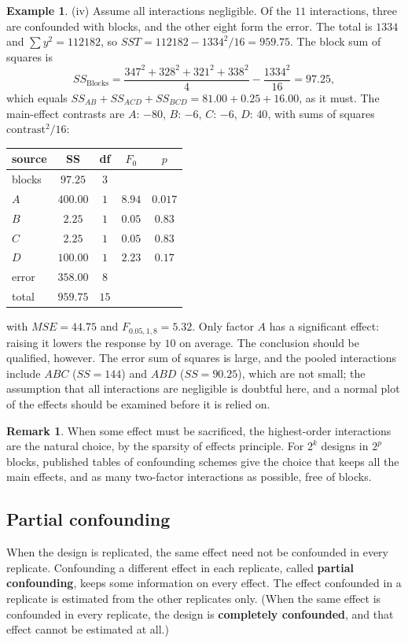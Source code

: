 \documentclass[11pt,a4paper]{article}
\numberwithin{equation}{section}
\theoremstyle{definition}
\newtheorem{exa}[thm]{Example}
\newtheorem*{remark}{Remark}
\begin{document}
\begin{exa}
(iv) Assume all interactions negligible. Of the $11$ interactions, three are confounded with blocks, and the other eight form the error.
The total is $1334$ and $\sum y^2 = 112182$, so $SST = 112182 - 1334^2/16 = 959.75$. The block sum of squares is
\[
SS_{\mathrm{Blocks}} = \frac{347^2 + 328^2 + 321^2 + 338^2}{4} - \frac{1334^2}{16} = 97.25 ,
\]
which equals $SS_{AB} + SS_{ACD} + SS_{BCD} = 81.00 + 0.25 + 16.00$, as it must. The main-effect contrasts are $A$: $-80$, $B$: $-6$, $C$: $-6$, $D$: $40$, with sums of squares
$\text{contrast}^2/16$:
\begin{center}
\begin{tabular}{l|c|c|c|c}
source & SS & df & $F_0$ & $p$ \\
\hline
blocks & $97.25$ & $3$ & & \\
$A$ & $400.00$ & $1$ & $8.94$ & $0.017$ \\
$B$ & $2.25$ & $1$ & $0.05$ & $0.83$ \\
$C$ & $2.25$ & $1$ & $0.05$ & $0.83$ \\
$D$ & $100.00$ & $1$ & $2.23$ & $0.17$ \\
error & $358.00$ & $8$ & & \\
\hline
total & $959.75$ & $15$ & &
\end{tabular}
\end{center}
with $MSE = 44.75$ and $F_{0.05,1,8} = 5.32$. Only factor $A$ has a significant effect: raising it lowers the response by $10$ on average. The conclusion
should be qualified, however. The error sum of squares is large, and the pooled interactions include $ABC$ ($SS = 144$) and $ABD$ ($SS = 90.25$), which
are not small; the assumption that all interactions are negligible is doubtful here, and a normal plot of the effects should be examined before
it is relied on.
\end{exa}

\begin{remark}
When some effect must be sacrificed, the highest-order interactions are the natural choice, by the sparsity of effects principle. For $2^k$ designs in
$2^p$ blocks, published tables of confounding schemes give the choice that keeps all the main effects, and as many two-factor
interactions as possible, free of blocks.
\end{remark}

\subsection{Partial confounding}
When the design is replicated, the same effect need not be confounded in every replicate. Confounding a different effect in each replicate,
called \textbf{partial confounding}, keeps some information on every effect. The effect confounded in a replicate is estimated from the other
replicates only. (When the same effect is confounded in every replicate, the design is \textbf{completely confounded}, and that effect cannot be
estimated at all.)
\end{document}
